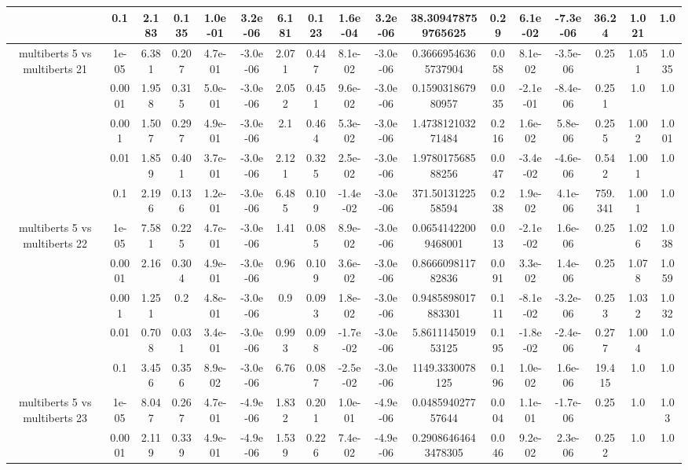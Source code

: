 \begin{tabular}{|c|c|c|c|c|c|c|c|c|c|c|c|c|c|c|c|c|}
 & 0.1 & 2.183 & 0.135 & 1.0e-01 & 3.2e-06 & 6.181 & 0.123 & 1.6e-04 & 3.2e-06 & 38.309478759765625 & 0.29 & 6.1e-02 & -7.3e-06 & 36.24 & 1.021 & 1.0 \\
\hline
\multirow{5}{*}{multiberts 5 vs multiberts 21} & 1e-05 & 6.381 & 0.207 & 4.7e-01 & -3.0e-06 & 2.071 & 0.447 & 8.1e-02 & -3.0e-06 & 0.36669546365737904 & 0.058 & 8.1e-02 & -3.5e-06 & 0.25 & 1.051 & 1.035 \\
 & 0.0001 & 1.958 & 0.315 & 5.0e-01 & -3.0e-06 & 2.052 & 0.451 & 9.6e-02 & -3.0e-06 & 0.159031867980957 & 0.035 & -2.1e-01 & -8.4e-06 & 0.251 & 1.0 & 1.0 \\
 & 0.001 & 1.507 & 0.297 & 4.9e-01 & -3.0e-06 & 2.1 & 0.464 & 5.3e-02 & -3.0e-06 & 1.473812103271484 & 0.216 & 1.6e-02 & 5.8e-06 & 0.255 & 1.002 & 1.001 \\
 & 0.01 & 1.859 & 0.401 & 3.7e-01 & -3.0e-06 & 2.121 & 0.325 & 2.5e-02 & -3.0e-06 & 1.978017568588256 & 0.047 & -3.4e-02 & -4.6e-06 & 0.542 & 1.001 & 1.0 \\
 & 0.1 & 2.196 & 0.136 & 1.2e-01 & -3.0e-06 & 6.485 & 0.109 & -1.4e-02 & -3.0e-06 & 371.5013122558594 & 0.238 & 1.9e-02 & 4.1e-06 & 759.341 & 1.001 & 1.0 \\
\hline
\multirow{5}{*}{multiberts 5 vs multiberts 22} & 1e-05 & 7.581 & 0.225 & 4.7e-01 & -3.0e-06 & 1.41 & 0.085 & 8.9e-02 & -3.0e-06 & 0.06541422009468001 & 0.013 & -2.1e-02 & 1.6e-06 & 0.25 & 1.026 & 1.038 \\
 & 0.0001 & 2.16 & 0.304 & 4.9e-01 & -3.0e-06 & 0.96 & 0.109 & 3.6e-02 & -3.0e-06 & 0.866609811782836 & 0.091 & 3.3e-02 & 1.4e-06 & 0.25 & 1.078 & 1.059 \\
 & 0.001 & 1.251 & 0.2 & 4.8e-01 & -3.0e-06 & 0.9 & 0.093 & 1.8e-02 & -3.0e-06 & 0.9485898017883301 & 0.111 & -8.1e-02 & -3.2e-06 & 0.253 & 1.032 & 1.032 \\
 & 0.01 & 0.708 & 0.031 & 3.4e-01 & -3.0e-06 & 0.993 & 0.098 & -1.7e-02 & -3.0e-06 & 5.861114501953125 & 0.195 & -1.8e-02 & -2.4e-06 & 0.277 & 1.004 & 1.0 \\
 & 0.1 & 3.456 & 0.356 & 8.9e-02 & -3.0e-06 & 6.76 & 0.087 & -2.5e-02 & -3.0e-06 & 1149.3330078125 & 0.196 & 1.0e-02 & 1.6e-06 & 19.415 & 1.0 & 1.0 \\
\hline
\multirow{5}{*}{multiberts 5 vs multiberts 23} & 1e-05 & 8.047 & 0.267 & 4.7e-01 & -4.9e-06 & 1.832 & 0.201 & 1.0e-01 & -4.9e-06 & 0.048594027757644 & 0.004 & 1.1e-01 & -1.7e-06 & 0.25 & 1.0 & 1.03 \\
 & 0.0001 & 2.119 & 0.339 & 4.9e-01 & -4.9e-06 & 1.539 & 0.226 & 7.4e-02 & -4.9e-06 & 0.29086464643478305 & 0.046 & 9.2e-02 & 2.3e-06 & 0.252 & 1.0 & 1.0 \\

\end{tabular}
